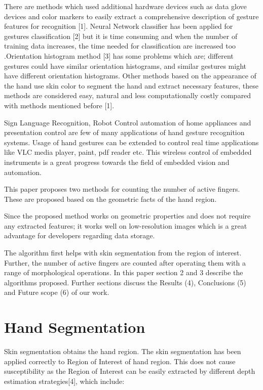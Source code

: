 \documentclass[conference]{IEEEtran}
\begin{document}
 There are methods which used additional hardware devices such as data glove devices and color markers to easily extract a comprehensive description of gesture features for recognition [1]. Neural Network classifier has been applied for gestures classification [2] but it is time consuming and when the number of training data increases, the time needed for classification are increased too .Orientation histogram method [3] has some problems which are; different gestures could have similar orientation histograms, and similar gestures might have different orientation histograms. Other methods based on the appearance of the hand use skin color to segment the hand and extract necessary features, these methods are considered easy, natural and less computationally costly compared with methods mentioned before [1].

Sign Language Recognition, Robot Control automation of home appliances and presentation control are few of many applications of hand gesture recognition systems. Usage of hand gestures can be extended to control real time applications like VLC media player, paint, pdf reader etc. This wireless control of embedded instruments is a great progress towards the field of embedded vision and automation.

This paper proposes two methods for counting the number of active fingers. These are proposed based on the geometric facts of the hand region. 

Since the proposed method works on geometric properties and does not require any extracted features; it works well on low-resolution images which is a great advantage for developers regarding data storage.

The algorithm first helps with skin segmentation from the region of interest. Further, the number of active fingers are counted after operating them with a range of morphological operations.
In this paper section 2 and 3 describe the algorithms proposed. Further sections discuss the Results (4), Conclusions (5) and Future scope (6) of our work. 




\section{Hand Segmentation}

Skin segmentation obtains the hand region. The skin segmentation has been applied correctly to Region of Interest of hand region. This does not cause susceptibility as the Region of Interest can be easily extracted by different depth estimation strategies[4], which include:
\end{document}
